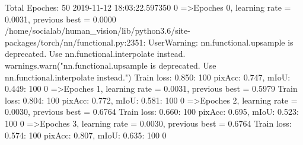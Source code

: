 Total Epoches: 50
2019-11-12 18:03:22.597350
  0%
=>Epoches 0, learning rate = 0.0031,                 previous best = 0.0000
/home/socialab/human_vision/lib/python3.6/site-packages/torch/nn/functional.py:2351: UserWarning: nn.functional.upsample is deprecated. Use nn.functional.interpolate instead.
  warnings.warn("nn.functional.upsample is deprecated. Use nn.functional.interpolate instead.")
Train loss: 0.850: 100%
pixAcc: 0.747, mIoU: 0.449: 100%
  0%
=>Epoches 1, learning rate = 0.0031,                 previous best = 0.5979
Train loss: 0.804: 100%
pixAcc: 0.772, mIoU: 0.581: 100%
  0%
=>Epoches 2, learning rate = 0.0030,                 previous best = 0.6764
Train loss: 0.660: 100%
pixAcc: 0.695, mIoU: 0.523: 100%
  0%
=>Epoches 3, learning rate = 0.0030,                 previous best = 0.6764
Train loss: 0.574: 100%
pixAcc: 0.807, mIoU: 0.635: 100%
  0%
